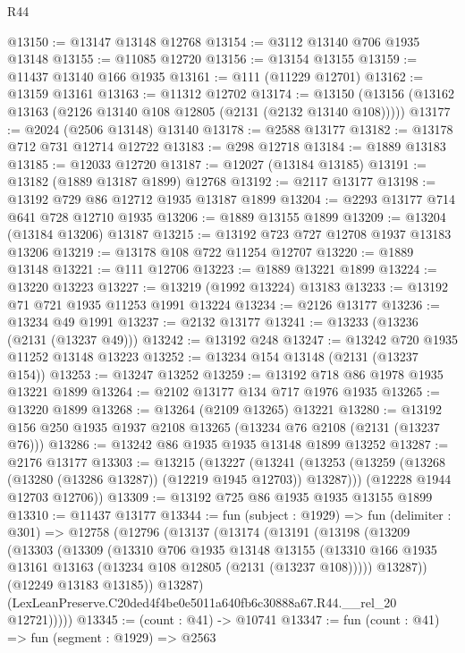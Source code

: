 \begin{lexlean}{R44}
\begin{coremodule}
@13150 := @13147 @13148 @12768
@13154 := @3112 @13140 @706 @1935 @13148
@13155 := @11085 @12720
@13156 := @13154 @13155
@13159 := @11437 @13140 @166 @1935
@13161 := @111 (@11229 @12701)
@13162 := @13159 @13161
@13163 := @11312 @12702
@13174 := @13150 (@13156 (@13162 @13163 (@2126 @13140 @108 @12805 (@2131 (@2132 @13140 @108)))))
@13177 := @2024 (@2506 @13148) @13140
@13178 := @2588 @13177
@13182 := @13178 @712 @731 @12714 @12722
@13183 := @298 @12718
@13184 := @1889 @13183
@13185 := @12033 @12720
@13187 := @12027 (@13184 @13185)
@13191 := @13182 (@1889 @13187 @1899) @12768
@13192 := @2117 @13177
@13198 := @13192 @729 @86 @12712 @1935 @13187 @1899
@13204 := @2293 @13177 @714 @641 @728 @12710 @1935
@13206 := @1889 @13155 @1899
@13209 := @13204 (@13184 @13206) @13187
@13215 := @13192 @723 @727 @12708 @1937 @13183 @13206
@13219 := @13178 @108 @722 @11254 @12707
@13220 := @1889 @13148
@13221 := @111 @12706
@13223 := @1889 @13221 @1899
@13224 := @13220 @13223
@13227 := @13219 (@1992 @13224) @13183
@13233 := @13192 @71 @721 @1935 @11253 @1991 @13224
@13234 := @2126 @13177
@13236 := @13234 @49 @1991
@13237 := @2132 @13177
@13241 := @13233 (@13236 (@2131 (@13237 @49)))
@13242 := @13192 @248
@13247 := @13242 @720 @1935 @11252 @13148 @13223
@13252 := @13234 @154 @13148 (@2131 (@13237 @154))
@13253 := @13247 @13252
@13259 := @13192 @718 @86 @1978 @1935 @13221 @1899
@13264 := @2102 @13177 @134 @717 @1976 @1935
@13265 := @13220 @1899
@13268 := @13264 (@2109 @13265) @13221
@13280 := @13192 @156 @250 @1935 @1937 @2108 @13265 (@13234 @76 @2108 (@2131 (@13237 @76)))
@13286 := @13242 @86 @1935 @1935 @13148 @1899 @13252
@13287 := @2176 @13177
@13303 := @13215
    (@13227
      (@13241 (@13253 (@13259 (@13268 (@13280 (@13286 @13287)) (@12219 @1945 @12703)) @13287)))
      (@12228 @1944 @12703 @12706))
@13309 := @13192 @725 @86 @1935 @1935 @13155 @1899
@13310 := @11437 @13177
@13344 := fun (subject : @1929) =>
  fun (delimiter : @301) =>
  @12758
    (@12796
      (@13137
        (@13174
          (@13191
            (@13198
              (@13209
                (@13303
                  (@13309
                    (@13310
                      @706
                      @1935
                      @13148
                      @13155
                      (@13310 @166 @1935 @13161 @13163 (@13234 @108 @12805 (@2131 (@13237 @108)))))
                    @13287))
                (@12249 @13183 @13185))
              @13287)
            (LexLeanPreserve.C20ded4f4be0e5011a640fb6c30888a67.R44.__rel_20 @12721)))))
@13345 := (count : @41) -> @10741
@13347 := fun (count : @41) => fun (segment : @1929) => @2563

\end{coremodule}
\end{lexlean}

